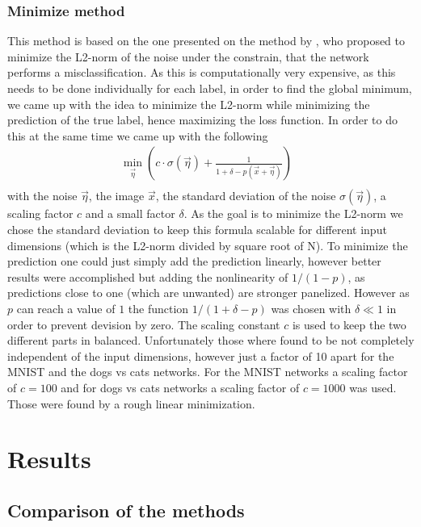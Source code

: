 \documentclass[%
 reprint,
 amsmath,amssymb,
 aps,
]{revtex4-1}
\begin{document}
\subsubsection*{Minimize method}
This method is based on the one presented on the method by \citeauthor{paperMinimize}, who proposed to minimize the L2-norm of the noise under the constrain, that the network performs a misclassification. As this is computationally very expensive, as this needs to be done individually for each label, in order to find the global minimum, we came up with the idea to minimize the L2-norm while minimizing the prediction of the true label, hence maximizing the loss function. In order to do this at the same time we came up with the following
\begin{align}
\min_{\vec{\eta}} \left( c \cdot \sigma(\vec{\eta}) + \frac{1}{1 + \delta - p(\vec{x}+\vec{\eta})} \right) & \label{eq:minimize}\\
\end{align}
with the noise $\vec{\eta}$, the image $\vec{x}$, the standard deviation of the noise $\sigma (\vec{\eta})$, a scaling factor $c$ and a small factor $\delta$. As the goal is to minimize the L2-norm we chose the standard deviation to keep this formula scalable for different input dimensions (which is the L2-norm divided by square root of N). To minimize the prediction one could just simply add the prediction linearly, however better results were accomplished but adding the nonlinearity of $1/(1-p)$, as predictions close to one (which are unwanted) are stronger panelized. However as $p$ can reach a value of $1$ the function $1/(1 + \delta - p)$ was chosen with $\delta \ll 1$ in order to prevent devision by zero. The scaling constant $c$ is used to keep the two different parts in balanced. Unfortunately those where found to be not completely independent of the input dimensions, however just a factor of 10 apart for the MNIST and the dogs vs cats networks. For the MNIST networks a scaling factor of $c = 100$ and for dogs vs cats networks a scaling factor of $c = 1000$ was used. Those were found by a rough linear minimization.

\section{Results}

\subsection{Comparison of the methods}
\end{document}
